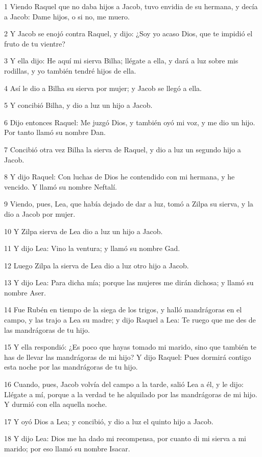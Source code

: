\par 1 Viendo Raquel que no daba hijos a Jacob, tuvo envidia de su hermana, y decía a Jacob: Dame hijos, o si no, me muero.
\par 2 Y Jacob se enojó contra Raquel, y dijo: ¿Soy yo acaso Dios, que te impidió el fruto de tu vientre?
\par 3 Y ella dijo: He aquí mi sierva Bilha; llégate a ella, y dará a luz sobre mis rodillas, y yo también tendré hijos de ella.
\par 4 Así le dio a Bilha su sierva por mujer; y Jacob se llegó a ella.
\par 5 Y concibió Bilha, y dio a luz un hijo a Jacob.
\par 6 Dijo entonces Raquel: Me juzgó Dios, y también oyó mi voz, y me dio un hijo. Por tanto llamó su nombre Dan.
\par 7 Concibió otra vez Bilha la sierva de Raquel, y dio a luz un segundo hijo a Jacob.
\par 8 Y dijo Raquel: Con luchas de Dios he contendido con mi hermana, y he vencido. Y llamó su nombre Neftalí.
\par 9 Viendo, pues, Lea, que había dejado de dar a luz, tomó a Zilpa su sierva, y la dio a Jacob por mujer.
\par 10 Y Zilpa sierva de Lea dio a luz un hijo a Jacob.
\par 11 Y dijo Lea: Vino la ventura; y llamó su nombre Gad.
\par 12 Luego Zilpa la sierva de Lea dio a luz otro hijo a Jacob.
\par 13 Y dijo Lea: Para dicha mía; porque las mujeres me dirán dichosa; y llamó su nombre Aser.
\par 14 Fue Rubén en tiempo de la siega de los trigos, y halló mandrágoras en el campo, y las trajo a Lea su madre; y dijo Raquel a Lea: Te ruego que me des de las mandrágoras de tu hijo.
\par 15 Y ella respondió: ¿Es poco que hayas tomado mi marido, sino que también te has de llevar las mandrágoras de mi hijo? Y dijo Raquel: Pues dormirá contigo esta noche por las mandrágoras de tu hijo.
\par 16 Cuando, pues, Jacob volvía del campo a la tarde, salió Lea a él, y le dijo: Llégate a mí, porque a la verdad te he alquilado por las mandrágoras de mi hijo. Y durmió con ella aquella noche.
\par 17 Y oyó Dios a Lea; y concibió, y dio a luz el quinto hijo a Jacob.
\par 18 Y dijo Lea: Dios me ha dado mi recompensa, por cuanto di mi sierva a mi marido; por eso llamó su nombre Isacar.

